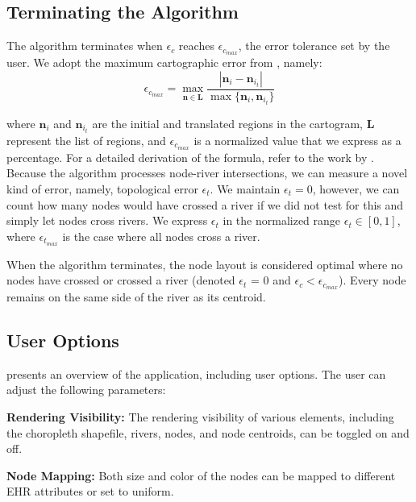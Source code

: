 \documentclass[Afour,sagev,times]{sagej}
\newcommand{\bobgraph}[1]{\noindent\textbf{#1}}
\newcommand{\nodeList}{\bm{L}}
\newcommand{\nodeError}{\epsilon}
\newcommand{\nodeCartographicError}{\nodeError_{c}}
\newcommand{\nodeCartographicErrorMax}{\nodeError_{c_{max}}}
\newcommand{\nodeTopologicalError}{\nodeError_{t}}
\newcommand{\nodeTopologicalErrorMax}{\nodeError_{t_{max}}}
\newcommand{\node}{\bm{n}}
\begin{document}
\subsection{Terminating the Algorithm}
\label{subsec:{Terminating the Algorithm}}

The algorithm terminates when $ \nodeCartographicError $ reaches $ \nodeCartographicErrorMax $, the error tolerance set by the user.
We adopt the maximum cartographic error from \citet{alam2015Quantitative}, namely: $$ \nodeCartographicErrorMax = \max _{\node \in \nodeList} \frac{|\node_i-\node_{i_t}|}{\max \{\node_i, \node_{i_t}\}}
$$

where $ \node_i $ and $ \node_{i_t} $ are the initial and translated regions in the cartogram, $ \nodeList $ represent the list of regions, and $ \nodeCartographicErrorMax $ is a normalized value that we express as a percentage.
For a detailed derivation of the formula, refer to the work by \citet{alam2015Quantitative}.
Because the algorithm processes node-river intersections, we can measure a novel kind of error, namely, topological error $ \nodeTopologicalError $.
We maintain $ \nodeTopologicalError = 0 $, however, we can count how many nodes would have crossed a river if we did not test for this and simply let nodes cross rivers.
We express $ \nodeTopologicalError $ in the normalized range $ \nodeTopologicalError \in [0,1] $, where $ \nodeTopologicalErrorMax $ is the case where all nodes cross a river.

When the algorithm terminates, the node layout is considered optimal where no nodes have crossed or crossed a river (denoted $ \nodeTopologicalError $ = 0 and $ \nodeCartographicError < \nodeCartographicErrorMax $).
Every node remains on the same side of the river as its centroid.

\subsection{User Options}\label{subsec:{UserOptions}}

 presents an overview of the application, including user options.
The user can adjust the following parameters:

\bobgraph{Rendering Visibility:} The rendering visibility of various elements, including the choropleth shapefile, rivers, nodes, and node centroids, can be toggled on and off.

\bobgraph{Node Mapping:} Both size and color of the nodes can be mapped to different EHR attributes or set to uniform.
\end{document}
